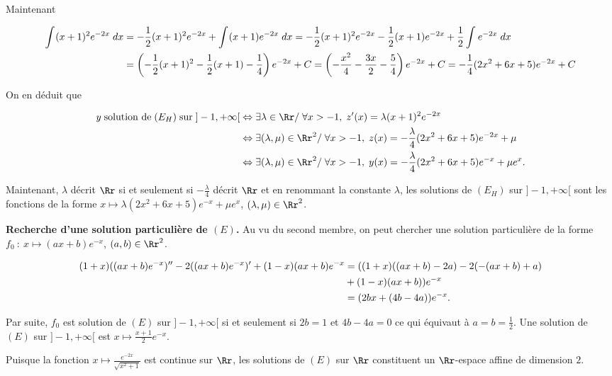 {\begin{enumerate}
{Maintenant

\begin{align*}\ensuremath
\int_{}^{}(x+1)^2e^{-2x}\;dx&=- \frac{1}{2}(x+1)^2e^{-2x}+\int_{}^{}(x+1)e^{-2x}\;dx=- \frac{1}{2}(x+1)^2e^{-2x}- \frac{1}{2}(x+1)e^{-2x}+ \frac{1}{2}\int_{}^{}e^{-2x}\;dx\\
 &=\left(- \frac{1}{2}(x+1)^2- \frac{1}{2}(x+1)- \frac{1}{4}\right)e^{-2x}+C=\left(- \frac{x^2}{4}- \frac{3x}{2}- \frac{5}{4}\right)e^{-2x}+C=- \frac{1}{4}(2x^2+6x+5)e^{-2x}+C
\end{align*}

On en déduit que

\begin{align*}\ensuremath
y\;\text{solution de}\;(E_H)\;\text{sur}\;]-1,+\infty[&\Leftrightarrow\exists\lambda\in\Rr/\;\forall x>-1,\;z'(x)=\lambda(x+1)^2e^{-2x}\\
 &\Leftrightarrow\exists(\lambda,\mu)\in\Rr^2/\;\forall x>-1,\;z(x)=- \frac{\lambda}{4}(2x^2+6x+5)e^{-2x}+\mu\\
 &\Leftrightarrow\exists(\lambda,\mu)\in\Rr^2/\;\forall x>-1,\;y(x)=- \frac{\lambda}{4}(2x^2+6x+5)e^{-x}+\mu e^x.
\end{align*}

Maintenant, $\lambda$ décrit $\Rr$ si et seulement si $- \frac{\lambda}{4}$ décrit $\Rr$ et en renommant la constante $\lambda$, les solutions de $(E_H)$ sur $]-1,+\infty[$ sont les fonctions de la forme $x\mapsto\lambda(2x^2+6x+5)e^{-x}+\mu e^x$, $(\lambda,\mu)\in\Rr^2$.

\textbf{Recherche d'une solution particulière de $(E)$.} Au vu du second membre, on peut chercher une solution particulière de la forme $f_0~:~x\mapsto(ax+b)e^{-x}$, $(a,b)\in\Rr^2$.

\begin{align*}\ensuremath
(1+x)((ax+b)e^{-x})''-2((ax+b)e^{-x})'+(1-x)(ax+b)e^{-x}&=((1+x)((ax+b)-2a)-2(-(ax+b)+a)\\
 &+(1-x)(ax+b))e^{-x}\\
 &=(2bx+(4b-4a))e^{-x}.
\end{align*}

Par suite, $f_0$ est solution de $(E)$ sur $]-1,+\infty[$ si et seulement si $2b=1$ et $4b-4a=0$ ce qui équivaut à $a=b= \frac{1}{2}$. Une solution de $(E)$ sur $]-1,+\infty[$ est $x\mapsto \frac{x+1}{2}e^{-x}$.

\begin{center}
\fbox{
$\mathcal{S}_{]-1,+\infty[}=\left\{x\mapsto\lambda(2x^2+6x+5)e^{-x}+\mu e^x+ \frac{x+1}{2}e^{-x},\;(\lambda,\mu)\in\Rr^2\right\}$.
}
\end{center}
Puisque la fonction $x\mapsto \frac{e^{-2x}}{\sqrt{x^2+1}}$ est continue sur $\Rr$, les solutions de $(E)$ sur $\Rr$ constituent un $\Rr$-espace affine de dimension $2$.

}
\end{enumerate}}
